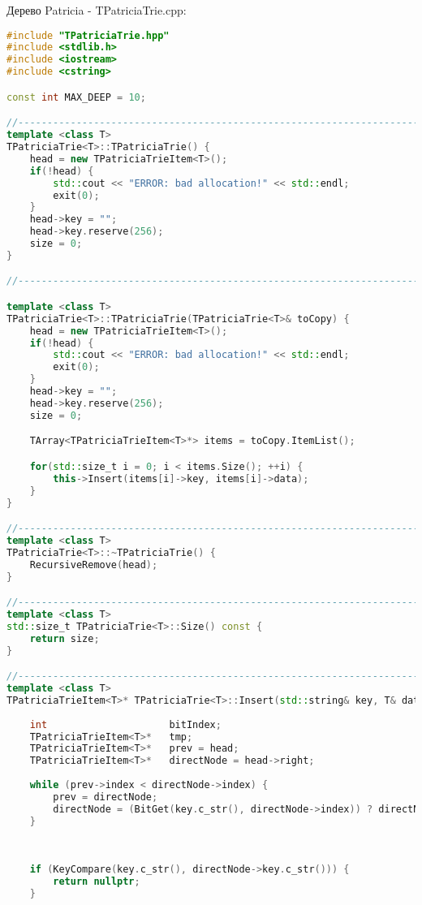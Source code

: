 Дерево Patricia - TPatriciaTrie.cpp:
\begin{lstlisting}[language=C++]
#include "TPatriciaTrie.hpp"
#include <stdlib.h>
#include <iostream>
#include <cstring>

const int MAX_DEEP = 10;

//----------------------------------------------------------------------------
template <class T>
TPatriciaTrie<T>::TPatriciaTrie() {
    head = new TPatriciaTrieItem<T>();
    if(!head) {
        std::cout << "ERROR: bad allocation!" << std::endl;
        exit(0);
    }
    head->key = "";
    head->key.reserve(256);
    size = 0;
}

//----------------------------------------------------------------------------

template <class T>
TPatriciaTrie<T>::TPatriciaTrie(TPatriciaTrie<T>& toCopy) {
    head = new TPatriciaTrieItem<T>();
    if(!head) {
        std::cout << "ERROR: bad allocation!" << std::endl;
        exit(0);
    }
    head->key = "";
    head->key.reserve(256);
    size = 0;

    TArray<TPatriciaTrieItem<T>*> items = toCopy.ItemList();

    for(std::size_t i = 0; i < items.Size(); ++i) {
        this->Insert(items[i]->key, items[i]->data);
    }
}

//----------------------------------------------------------------------------
template <class T>
TPatriciaTrie<T>::~TPatriciaTrie() {
    RecursiveRemove(head);
}

//----------------------------------------------------------------------------
template <class T>
std::size_t TPatriciaTrie<T>::Size() const {
    return size;
}

//----------------------------------------------------------------------------
template <class T>
TPatriciaTrieItem<T>* TPatriciaTrie<T>::Insert(std::string& key, T& data) {
    
    int                     bitIndex;
    TPatriciaTrieItem<T>*   tmp;
    TPatriciaTrieItem<T>*   prev = head;
    TPatriciaTrieItem<T>*   directNode = head->right;
    
    while (prev->index < directNode->index) {
        prev = directNode;
        directNode = (BitGet(key.c_str(), directNode->index)) ? directNode->right : directNode->left;
    }
    
    
    
    if (KeyCompare(key.c_str(), directNode->key.c_str())) {
        return nullptr;
    }
    

\end{lstlisting}
